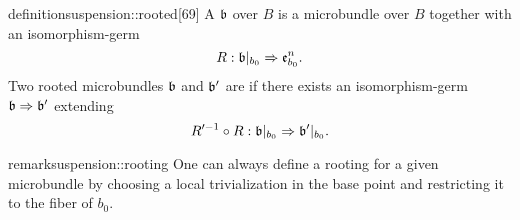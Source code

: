 \begin{mystatement}{definition}{suspension::rooted}[69]
    A  $\bb$ over $B$ is a microbundle
    over $B$ together with an isomorphism-germ
    \[ \germdef{R}{\bbb}{\be{b_0}}. \]
    Two rooted microbundles $\bb$ and $\bb'$ are 
    if there exists an isomorphism-germ $\germ{\bb}{\bb'}$ extending
    \[ \germdef{\inv{R'} \circ R}{\bbb}{\bb'\restr{b_0}}. \]
\end{mystatement}

\begin{mystatement}{remark}{suspension::rooting}
    One can always define a rooting for a given microbundle 
    by choosing a local trivialization in the base point and restricting
    it to the fiber of $b_0$.
\end{mystatement}